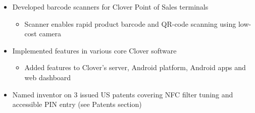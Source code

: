 \begin{itemize}
   \item Developed barcode scanners for Clover Point of Sales terminals \itemsep -2pt
   \begin{itemize}
   \item[$\checkmark$]  \itemsep -8pt%
    Scanner enables rapid product barcode and QR-code scanning using low-cost camera
    \iftoggle{detailedVersion}{\begin{itemize}\item[\tiny$\blacksquare$] Combines techniques from Computer Vision, Image Processing and Algorithms
   \item[\tiny$\blacksquare$] All code written in C++, Java for Android, with prototyping in Matlab
   \item[\tiny$\blacksquare$] Used hardware parallelization, OpenCV and developed algorithms for improved image enhancement
   \end{itemize}}{}
     \end{itemize}
  \item Implemented features in various core Clover software  \itemsep -2pt
   \begin{itemize}
   \item[$\checkmark$]  \itemsep -8pt%
    Added features to Clover's server, Android platform, Android apps and web dashboard
    \iftoggle{detailedVersion}
    { \begin{itemize}
       \item[\tiny$\blacksquare$] Languages used are Java, C++, C, Javascript and SQL
      \end{itemize}
    } {}
   \end{itemize}
   \item Named inventor on 3 issued US patents covering NFC filter tuning and accessible PIN entry (see Patents section)
\end{itemize}
 
